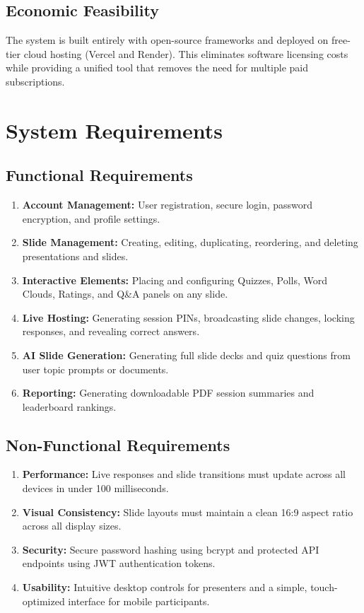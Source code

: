 \subsection{Economic Feasibility}
The system is built entirely with open-source frameworks and deployed on free-tier cloud hosting (Vercel and Render). This eliminates software licensing costs while providing a unified tool that removes the need for multiple paid subscriptions.

\section{System Requirements}

\subsection{Functional Requirements}
\begin{enumerate}
    \item \textbf{Account Management:} User registration, secure login, password encryption, and profile settings.
    \item \textbf{Slide Management:} Creating, editing, duplicating, reordering, and deleting presentations and slides.
    \item \textbf{Interactive Elements:} Placing and configuring Quizzes, Polls, Word Clouds, Ratings, and Q\&A panels on any slide.
    \item \textbf{Live Hosting:} Generating session PINs, broadcasting slide changes, locking responses, and revealing correct answers.
    \item \textbf{AI Slide Generation:} Generating full slide decks and quiz questions from user topic prompts or documents.
    \item \textbf{Reporting:} Generating downloadable PDF session summaries and leaderboard rankings.
\end{enumerate}

\subsection{Non-Functional Requirements}
\begin{enumerate}
    \item \textbf{Performance:} Live responses and slide transitions must update across all devices in under 100 milliseconds.
    \item \textbf{Visual Consistency:} Slide layouts must maintain a clean 16:9 aspect ratio across all display sizes.
    \item \textbf{Security:} Secure password hashing using bcrypt and protected API endpoints using JWT authentication tokens.
    \item \textbf{Usability:} Intuitive desktop controls for presenters and a simple, touch-optimized interface for mobile participants.
\end{enumerate}

